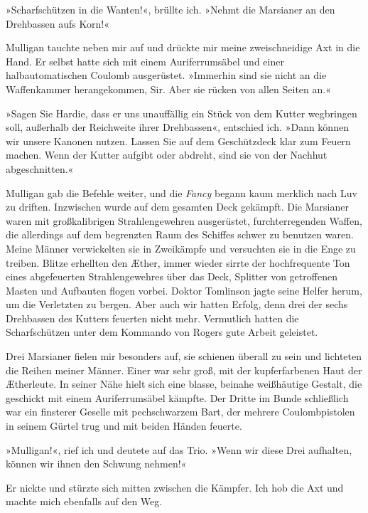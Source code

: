 »Scharfschützen in die Wanten!«, brüllte ich. »Nehmt die Marsianer
an den Drehbassen aufs Korn!«

Mulligan tauchte neben mir auf und drückte mir meine zweischneidige
Axt in die Hand. Er selbst hatte sich mit einem Auriferrumsäbel und
einer halbautomatischen Coulomb ausgerüstet. »Immerhin sind sie
nicht an die Waffenkammer herangekommen, Sir. Aber sie rücken von
allen Seiten an.«

»Sagen Sie Hardie, dass er uns unauffällig ein Stück von dem Kutter
wegbringen soll, außerhalb der Reichweite ihrer Drehbassen«,
entschied ich. »Dann können wir unsere Kanonen nutzen. Lassen Sie
auf dem Geschützdeck klar zum Feuern machen. Wenn der Kutter
aufgibt oder abdreht, sind sie von der Nachhut abgeschnitten.«

\bigpar

Mulligan gab die Befehle weiter, und die \emph{Fancy} begann kaum
merklich nach Luv zu driften. Inzwischen wurde auf dem gesamten
Deck gekämpft. Die Marsianer waren mit großkalibrigen
Strahlengewehren ausgerüstet, furchterregenden Waffen, die
allerdings auf dem begrenzten Raum des Schiffes schwer zu benutzen
waren. Meine Männer verwickelten sie in Zweikämpfe und versuchten
sie in die Enge zu treiben. Blitze erhellten den Æther, immer
wieder sirrte der hochfrequente Ton eines abgefeuerten
Strahlengewehres über das Deck, Splitter von getroffenen Masten und
Aufbauten flogen vorbei. Doktor Tomlinson jagte seine Helfer herum,
um die Verletzten zu bergen. Aber auch wir hatten Erfolg, denn drei
der sechs Drehbassen des Kutters feuerten nicht mehr. Vermutlich
hatten die Scharfschützen unter dem Kommando von Rogers gute Arbeit
geleistet.

Drei Marsianer fielen mir besonders auf, sie schienen überall zu
sein und lichteten die Reihen meiner Männer. Einer war sehr groß,
mit der kupferfarbenen Haut der Ætherleute. In seiner Nähe hielt
sich eine blasse, beinahe weißhäutige Gestalt, die geschickt mit
einem Auriferrumsäbel kämpfte. Der Dritte im Bunde schließlich war
ein finsterer Geselle mit pechschwarzem Bart, der mehrere
Coulombpistolen in seinem Gürtel trug und mit beiden Händen
feuerte.

»Mulligan!«, rief ich und deutete auf das Trio. »Wenn wir diese
Drei aufhalten, können wir ihnen den Schwung nehmen!«

Er nickte und stürzte sich mitten zwischen die Kämpfer. Ich hob die
Axt und machte mich ebenfalls auf den Weg.

